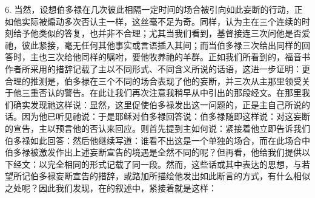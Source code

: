 6. 当然，设想伯多禄在几次彼此相隔一定时间的场合被引向如此妄断的行动，正如他实际被煽动多次否认主一样，这丝毫不足为奇。同样，认为主在三个连续的时刻给予他类似的答复，也并非不合理；尤其当我们看到，基督接连三次问他是否爱祂，彼此紧接，毫无任何其他事实或言语插入其间；而当伯多禄三次给出同样的回答时，主也三次给他同样的嘱咐，要他牧养祂的羊群。正如我们所看到的，福音书作者所采用的措辞记载了主以不同形式、不同含义所说的话语，这进一步证明：更合理的推测是，伯多禄在三个不同的场合表现了他的妄断，并三次从主那里领受关于他三重否认的警告。在此让我们再次注意我稍早从中引出的那段经文。在那里我们确实发现祂这样说：显然，这里促使伯多禄发出这一问题的，正是主自己所说的话。因为他已听见祂说：于是耶稣对伯多禄回答说：伯多禄随即这样说：对这妄断的宣告，主以预言他的否认来回应。则首先提到主如何说：紧接着他立即告诉我们伯多禄如此回答：然后他继续写道：谁看不出这是一个单独的场合，而在此场合中伯多禄被激发作出上述妄断宣告的境遇是全然不同的呢？但再看，他给我们提供以下经文：以完全相同的形式记载了同一段。然而，这些话或其中表达的思想，与若望所记伯多禄妄断宣告的措辞，或路加所描绘他发出如此断言的方式，有什么相似之处呢？因此我们发现，在的叙述中，紧接着就是这样：\par

